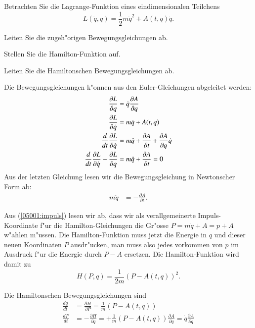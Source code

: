Betrachten Sie die Lagrange-Funktion eines eindimensionalen Teilchens
\[
L(\dot q, q)=\frac12m\dot q^2 + A(t,q)\dot q.
\]
\begin{teilaufgaben}
\item
Leiten Sie die zugeh"origen Bewegungsgleichungen ab.
\item
Stellen Sie die Hamilton-Funktion auf.
\item
Leiten Sie die Hamiltonschen Bewegungsgleichungen ab.
\end{teilaufgaben}


\begin{loesung}
\begin{teilaufgaben}
\item
Die Bewegungsgleichungen k"onnen aus den Euler-Gleichungen abgeleitet
werden:
\begin{align}
\frac{\partial L}{\partial q}&=\dot q \frac{\partial A}{\partial q}
\notag
\\
\frac{\partial L}{\partial \dot q}&=m\dot q+ A(t,q)
\label{05001:impuls}
\\
\frac{d}{dt}\frac{\partial L}{\partial\dot q}
&=
m\ddot q+\frac{\partial A}{\partial t}+\frac{\partial A}{\partial q}\dot q
\label{05001:derivative}
\\
\frac{d}{dt}\frac{\partial L}{\partial\dot q}-\frac{\partial L}{\partial q}
&=
m\ddot q+\frac{\partial A}{\partial t}
=0
\notag
\end{align}
Aus der letzten Gleichung lesen wir die Bewegungsgleichung in Newtonscher
Form ab:
\begin{align*}
m\ddot q&=-\frac{\partial A}{\partial t}.
\end{align*}
\item
Aus (\ref{05001:impuls}) lesen wir ab, dass wir als verallgemeinerte
Impuls-Koordinate f"ur die Hamilton-Gleichungen die Gr"osse
$P=m\dot q+A=p+A$ w"ahlen m"ussen.
Die Hamilton-Funktion muss jetzt die Energie in $q$ und dieser neuen
Koordinaten $P$ ausdr"ucken, man muss also jedes vorkommen von $p$
im Ausdruck f"ur die Energie durch $P-A$ ersetzen.
Die Hamilton-Funktion wird damit zu
\[
H(P,q)=\frac1{2m}(P-A(t,q))^2.
\]
\item
Die Hamiltonschen Bewegungsgleichungen sind
\begin{align*}
\frac{dq}{dt}
&=
\frac{\partial H}{\partial P}
=
\frac1m(P-A(t,q))
\\
\frac{dP}{dt}
&=
-\frac{\partial H}{\partial q}
=
+\frac1m(P-A(t,q))\frac{\partial A}{\partial q}
=
\dot q\frac{\partial A}{\partial q}
\end{align*}

\end{teilaufgaben}
\end{loesung}
